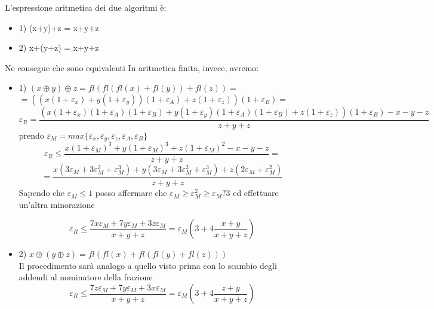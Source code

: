 L'espressione aritmetica dei due algoritmi è:\\
\begin{itemize}
\item{1)} (x+y)+z = x+y+z 
\item{2)}  x+(y+z) = x+y+z 
\end{itemize}
Ne consegue che sono equivalenti
In aritmetica finita, invece, avremo:
\begin{itemize}
\item{1)} \( (x\oplus y)\oplus z = fl(fl(fl(x) + fl(y)) +fl(z)) = \)\\
\( =((x(1+\varepsilon_x) + y(1+\varepsilon_y))(1+\varepsilon_A) +z(1+\varepsilon_z))(1+\varepsilon_B) = \) \\
\[\varepsilon_R =\frac{(x(1+\varepsilon_x)(1+\varepsilon_A)(1+\varepsilon_B) + y(1+\varepsilon_y)(1+\varepsilon_A)(1+\varepsilon_B)+z(1+\varepsilon_z))(1+\varepsilon_B) -x-y-z}{z+y+z}     \]
prendo \( \varepsilon_M = max\{\varepsilon_x, \varepsilon_y, \varepsilon_z, \varepsilon_A, \varepsilon_B\}\)
\[\varepsilon_R \leq \frac{x(1+\varepsilon_M)^3 + y(1+\varepsilon_M)^3+z(1+\varepsilon_M)^2 -x-y-z}{z+y+z} = \]
\[ =  \frac{x(3\varepsilon_M + 3\varepsilon_M^2 +\varepsilon_M^3) + y(3\varepsilon_M + 3\varepsilon_M^2 +\varepsilon_M^3)+z(2\varepsilon_M + \varepsilon_M^2)}{z+y+z}    \]
Sapendo che \(\varepsilon_M \leq 1 \) posso affermare che \( \varepsilon_M \geq \varepsilon_M^2 \geq \varepsilon_M?3 \) ed effettuare un'altra minorazione

\[ \varepsilon_R \leq \frac{7x\varepsilon_M + 7y\varepsilon_M + 3z\varepsilon_M}{x+y+z} = \varepsilon_M(3+4\frac{x+y}{x+y+z}) \]

\item{2)}  \( x\oplus (y\oplus z) =fl(fl(x) +fl( fl(y) +fl(z)))     \) \\
Il procedimento sarà analogo a quello visto prima con lo scambio degli addendi al nominatore della frazione
\[ \varepsilon_R \leq \frac{7z\varepsilon_M + 7y\varepsilon_M + 3x\varepsilon_M}{x+y+z} = \varepsilon_M(3+4\frac{z+y}{x+y+z}) \]
\end{itemize}